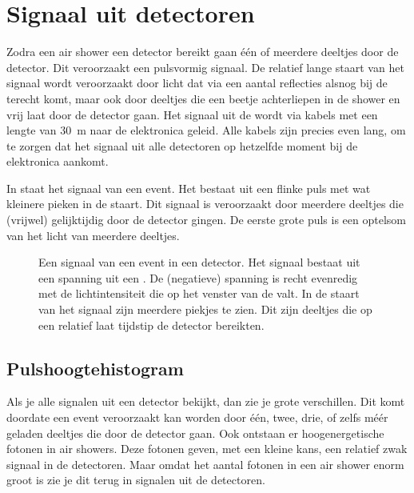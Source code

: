\section{Signaal uit \hisparc detectoren}

Zodra een air shower een detector bereikt gaan één of meerdere deeltjes
door de detector.  Dit veroorzaakt een pulsvormig signaal.  De relatief
lange staart van het signaal wordt veroorzaakt door licht dat via een
aantal reflecties alsnog bij de \pmt terecht komt, maar ook door deeltjes
die een beetje achterliepen in de shower en vrij laat door de detector
gaan.  Het signaal uit de \pmt wordt via kabels met een lengte van
\SI{30}{\meter} naar de \hisparc elektronica geleid.  Alle kabels zijn
precies even lang, om te zorgen dat het signaal uit alle detectoren op
hetzelfde moment bij de elektronica aankomt.

In  staat het signaal van een \hisparc event.  Het
bestaat uit een flinke puls met wat kleinere pieken in de staart.  Dit
signaal is veroorzaakt door meerdere deeltjes die (vrijwel) gelijktijdig
door de detector gingen.  De eerste grote puls is een optelsom van het
licht van meerdere deeltjes.

\begin{figure}
\centering

\caption{Een signaal van een event in een \hisparc
detector. %
Het signaal bestaat uit een spanning uit een \pmt.  De (negatieve)
spanning is recht evenredig met de lichtintensiteit die op het venster van
de \pmt valt.  In de staart van het signaal zijn meerdere piekjes te zien.
Dit zijn deeltjes die op een relatief laat tijdstip de detector
bereikten.}
\label{fig:traces}
\end{figure}


\subsection{Pulshoogtehistogram}

Als je alle signalen uit een \hisparc detector bekijkt, dan zie je grote
verschillen.  Dit komt doordate een event veroorzaakt kan worden door één,
twee, drie, of zelfs méér geladen deeltjes die door de detector gaan.  Ook
ontstaan er hoogenergetische fotonen in air showers.  Deze fotonen geven,
met een kleine kans, een relatief zwak signaal in de detectoren.  Maar
omdat het aantal fotonen in een air shower enorm groot is zie je dit terug
in signalen uit de \hisparc detectoren.

